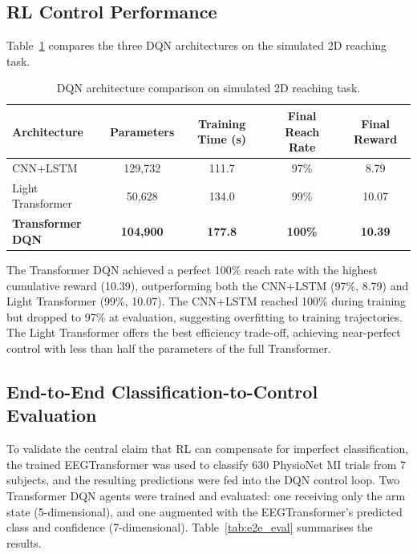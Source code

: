 \documentclass[12pt, a4paper]{article}
\begin{document}
\subsection{RL Control Performance}

Table~\ref{tab:dqn_comparison} compares the three DQN architectures on the simulated 2D reaching task.

\begin{table}[htbp]
\centering
\caption{DQN architecture comparison on simulated 2D reaching task.}
\label{tab:dqn_comparison}
\begin{tabular}{lcccc}
\toprule
\textbf{Architecture} & \textbf{Parameters} & \textbf{Training Time (s)} & \textbf{Final Reach Rate} & \textbf{Final Reward} \\
\midrule
CNN+LSTM          & 129,732  & 111.7  & 97\%  & 8.79 \\
Light Transformer & 50,628   & 134.0  & 99\%  & 10.07 \\
\textbf{Transformer DQN} & \textbf{104,900} & \textbf{177.8} & \textbf{100\%} & \textbf{10.39} \\
\bottomrule
\end{tabular}
\end{table}

The Transformer DQN achieved a perfect 100\% reach rate with the highest cumulative reward (10.39), outperforming both the CNN+LSTM (97\%, 8.79) and Light Transformer (99\%, 10.07). The CNN+LSTM reached 100\% during training but dropped to 97\% at evaluation, suggesting overfitting to training trajectories. The Light Transformer offers the best efficiency trade-off, achieving near-perfect control with less than half the parameters of the full Transformer.

\subsection{End-to-End Classification-to-Control Evaluation}
\label{sec:e2e_results}

To validate the central claim that RL can compensate for imperfect classification, the trained EEGTransformer was used to classify 630 PhysioNet MI trials from 7 subjects, and the resulting predictions were fed into the DQN control loop. Two Transformer DQN agents were trained and evaluated: one receiving only the arm state (5-dimensional), and one augmented with the EEGTransformer's predicted class and confidence (7-dimensional). Table~\ref{tab:e2e_eval} summarises the results.
\end{document}
